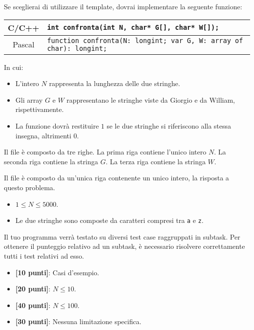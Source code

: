 Se sceglierai di utilizzare il template, dovrai implementare la seguente funzione:
\begin{center}\begin{tabularx}{\textwidth}{|c|X|}
\hline
C/C++  & \verb|int confronta(int N, char* G[], char* W[]);|\\
\hline
Pascal & \verb|function confronta(N: longint; var G, W: array of char): longint;|\\
\hline
\end{tabularx}\end{center}
In cui:
\begin{itemize}[nolistsep]
  \item L'intero $N$ rappresenta la lunghezza delle due stringhe.
  \item Gli array $G$ e $W$ rappresentano le stringhe viste da Giorgio e da William, rispettivamente.
  \item La funzione dovrà restituire $1$ se le due stringhe si riferiscono alla stessa insegna, altrimenti $0$.
\end{itemize}

\InputFile
Il file  è composto da tre righe. La prima riga contiene l'unico intero $N$. La seconda riga contiene la stringa $G$. La terza riga contiene la stringa $W$.

\OutputFile
Il file \outputfile{} è composto da un'unica riga contenente un unico intero, la risposta a questo problema.

\pagebreak
\Constraints
\begin{itemize}[nolistsep, itemsep=2mm]
  \item $1 \le N \le 5000$.
  \item Le due stringhe sono composte da caratteri compresi tra \texttt{a} e \texttt{z}.
\end{itemize}

\Scoring
Il tuo programma verrà testato su diversi test case raggruppati in subtask.
Per ottenere il punteggio relativo ad un subtask, è necessario risolvere
correttamente tutti i test relativi ad esso.

\begin{itemize}[nolistsep,itemsep=2mm]
  \item \textbf{ [10 punti]}: Casi d'esempio.
  \item \textbf{ [20 punti]}: $N \leq 10$.
  \item \textbf{ [40 punti]}: $N \leq 100$.
  \item \textbf{ [30 punti]}: Nessuna limitazione specifica.
\end{itemize}

